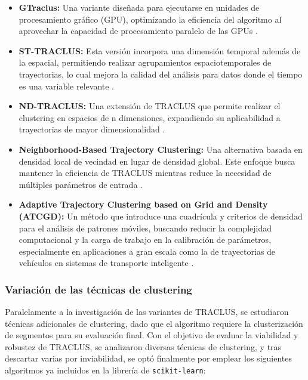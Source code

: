 \begin{itemize}
    \item \textbf{GTraclus:} Una variante diseñada para ejecutarse en unidades de procesamiento gráfico (GPU), optimizando la eficiencia del algoritmo al aprovechar la capacidad de procesamiento paralelo de las GPUs \cite{gtraclus}.

    \item \textbf{ST-TRACLUS:} Esta versión incorpora una dimensión temporal además de la espacial, permitiendo realizar agrupamientos espaciotemporales de trayectorias, lo cual mejora la calidad del análisis para datos donde el tiempo es una variable relevante \cite{st-traclus}.

    \item \textbf{ND-TRACLUS:} Una extensión de TRACLUS que permite realizar el clustering en espacios de n dimensiones, expandiendo su aplicabilidad a trayectorias de mayor dimensionalidad \cite{nd-traclus}.

    \item \textbf{Neighborhood-Based Trajectory Clustering:} Una alternativa basada en densidad local de vecindad en lugar de densidad global. Este enfoque busca mantener la eficiencia de TRACLUS mientras reduce la necesidad de múltiples parámetros de entrada \cite{nb-traclus}.

    \item \textbf{Adaptive Trajectory Clustering based on Grid and Density (ATCGD):} Un método que introduce una cuadrícula y criterios de densidad para el análisis de patrones móviles, buscando reducir la complejidad computacional y la carga de trabajo en la calibración de parámetros, especialmente en aplicaciones a gran escala como la de trayectorias de vehículos en sistemas de transporte inteligente \cite{atcgd}.
\end{itemize}

\subsubsection{Variación de las técnicas de clustering}

Paralelamente a la investigación de las variantes de TRACLUS, se estudiaron técnicas adicionales de clustering, dado que el algoritmo requiere la clusterización de segmentos para su evaluación final. Con el objetivo de evaluar la viabilidad y robustez de TRACLUS, se analizaron diversas técnicas de clustering, y tras descartar varias por inviabilidad, se optó finalmente por emplear los siguientes algoritmos ya incluidos en la librería de \texttt{scikit-learn}:

